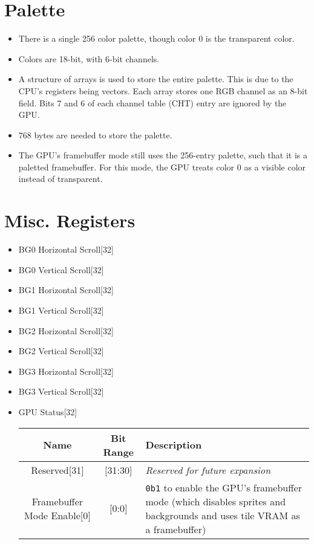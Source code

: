 \documentclass{article}
\begin{document}
\section{Palette}
	\begin{itemize}
	\item There is a single 256 color palette, though color 0 is the
	transparent color.

	\item Colors are 18-bit, with 6-bit channels.

	\item A structure of arrays is used to store the entire palette.  This
	is due to the CPU's registers being vectors. Each array stores one RGB
	channel as an 8-bit field.  Bits 7 and 6 of each channel table (CHT)
	entry are ignored by the GPU.

	\item 768 bytes are needed to store the palette. 

	\item The GPU's framebuffer mode still uses the 256-entry palette, such
	that it is a paletted framebuffer.  For this mode, the GPU treats color
	0 as a visible color instead of transparent.
	\end{itemize}
	\newpage

\section{Misc. Registers}
	\begin{itemize}
	\item BG0 Horizontal Scroll[32]
	\item BG0 Vertical Scroll[32]

	\item BG1 Horizontal Scroll[32]
	\item BG1 Vertical Scroll[32]

	\item BG2 Horizontal Scroll[32]
	\item BG2 Vertical Scroll[32]

	\item BG3 Horizontal Scroll[32]
	\item BG3 Vertical Scroll[32]

	\item GPU Status[32]
		\begin{table}[H]
			\begin{center}
				\begin{tabular}{|c|c|p{65mm}|}
					\hline
					\textbf{Name} & \textbf{Bit Range}
						& \textbf{Description}\\
					\hline
					Reserved[31] & [31:30]
						& \textit{Reserved for future expansion}\\
					Framebuffer Mode Enable[0] & [0:0]
						& \texttt{0b1} to enable the GPU's framebuffer mode
						(which disables sprites and backgrounds and uses
						tile VRAM as a framebuffer)\\
					\hline
				\end{tabular}
			\end{center}
		\end{table}
	\end{itemize}
	\newpage
\end{document}
